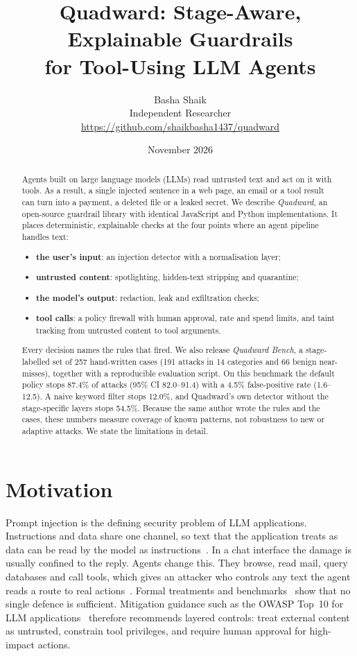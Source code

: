 \documentclass[10pt]{article}
\title{Quadward: Stage-Aware, Explainable Guardrails\\for Tool-Using LLM Agents}
\author{Basha Shaik\\Independent Researcher\\\small\url{https://github.com/shaikbasha1437/quadward}}
\date{November 2026}
\begin{document}
\maketitle

\begin{abstract}
Agents built on large language models (LLMs) read untrusted text and act on it with tools. As a result, a single injected sentence in a web page, an email or a tool result can turn into a payment, a deleted file or a leaked secret. We describe \emph{Quadward}, an open-source guardrail library with identical JavaScript and Python implementations. It places deterministic, explainable checks at the four points where an agent pipeline handles text:
\begin{itemize}
\item \textbf{the user's input}: an injection detector with a normalisation layer;
\item \textbf{untrusted content}: spotlighting, hidden-text stripping and quarantine;
\item \textbf{the model's output}: redaction, leak and exfiltration checks;
\item \textbf{tool calls}: a policy firewall with human approval, rate and spend limits, and taint tracking from untrusted content to tool arguments.
\end{itemize}
Every decision names the rules that fired. We also release \emph{Quadward Bench}, a stage-labelled set of 257 hand-written cases (191 attacks in 14 categories and 66 benign near-misses), together with a reproducible evaluation script. On this benchmark the default policy stops 87.4\% of attacks (95\% CI 82.0--91.4) with a 4.5\% false-positive rate (1.6--12.5). A naive keyword filter stops 12.0\%, and Quadward's own detector without the stage-specific layers stops 54.5\%. Because the same author wrote the rules and the cases, these numbers measure coverage of known patterns, not robustness to new or adaptive attacks. We state the limitations in detail.
\end{abstract}

\section{Motivation}
Prompt injection is the defining security problem of LLM applications. Instructions and data share one channel, so text that the application treats as data can be read by the model as instructions~\citep{perez2022ignore,greshake2023indirect}. In a chat interface the damage is usually confined to the reply. Agents change this. They browse, read mail, query databases and call tools, which gives an attacker who controls any text the agent reads a route to real actions~\citep{greshake2023indirect,zhan2024injecagent,debenedetti2024agentdojo}. Formal treatments and benchmarks~\citep{liu2024formalizing,yi2025bipia} show that no single defence is sufficient. Mitigation guidance such as the OWASP Top~10 for LLM applications~\citep{owasp2025llm} therefore recommends layered controls: treat external content as untrusted, constrain tool privileges, and require human approval for high-impact actions.
\end{document}
